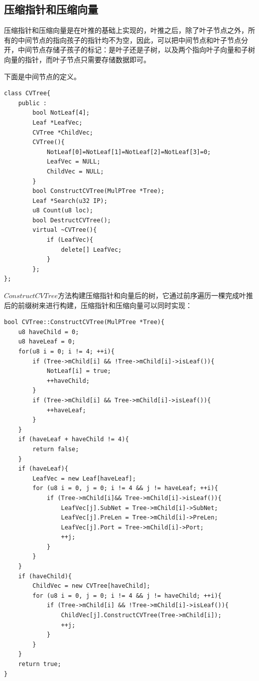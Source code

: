 \documentclass[UTF8,noindent]{ctexart}
\begin{document}
\subsection*{压缩指针和压缩向量}
压缩指针和压缩向量是在叶推的基础上实现的，叶推之后，除了叶子节点之外，所有的中间节点的指向孩子的指针均不为空，因此，可以把中间节点和叶子节点分开，中间节点存储子孩子的标记：是叶子还是子树，以及两个指向叶子向量和子树向量的指针，而叶子节点只需要存储数据即可。

下面是中间节点的定义。
\begin{lstlisting}
class CVTree{
	public :
		bool NotLeaf[4];
		Leaf *LeafVec;
		CVTree *ChildVec;
		CVTree(){
			NotLeaf[0]=NotLeaf[1]=NotLeaf[2]=NotLeaf[3]=0;
			LeafVec = NULL;
			ChildVec = NULL;
		}
		bool ConstructCVTree(MulPTree *Tree);
		Leaf *Search(u32 IP);
		u8 Count(u8 loc);
		bool DestructCVTree();
		virtual ~CVTree(){
			if (LeafVec){
				delete[] LeafVec;
			}
		};
};
\end{lstlisting}

$ConstructCVTree$方法构建压缩指针和向量后的树，它通过前序遍历一棵完成叶推后的前缀树来进行构建，压缩指针和压缩向量可以同时实现：
\begin{lstlisting}
bool CVTree::ConstructCVTree(MulPTree *Tree){
	u8 haveChild = 0;
	u8 haveLeaf = 0;
	for(u8 i = 0; i != 4; ++i){
		if (Tree->mChild[i] && !Tree->mChild[i]->isLeaf()){
			NotLeaf[i] = true;
			++haveChild;
		}
		if (Tree->mChild[i] && Tree->mChild[i]->isLeaf()){
			++haveLeaf;
		}
	}
	if (haveLeaf + haveChild != 4){
		return false;
	}
	if (haveLeaf){
		LeafVec = new Leaf[haveLeaf];
		for (u8 i = 0, j = 0; i != 4 && j != haveLeaf; ++i){
			if (Tree->mChild[i]&& Tree->mChild[i]->isLeaf()){
				LeafVec[j].SubNet = Tree->mChild[i]->SubNet;
				LeafVec[j].PreLen = Tree->mChild[i]->PreLen;
				LeafVec[j].Port = Tree->mChild[i]->Port;
				++j;
			}
		}
	}
	if (haveChild){
		ChildVec = new CVTree[haveChild];
		for (u8 i = 0, j = 0; i != 4 && j != haveChild; ++i){
			if (Tree->mChild[i] && !Tree->mChild[i]->isLeaf()){
				ChildVec[j].ConstructCVTree(Tree->mChild[i]);
				++j;
			}
		}
	}
	return true;
}
\end{lstlisting}
\end{document}
